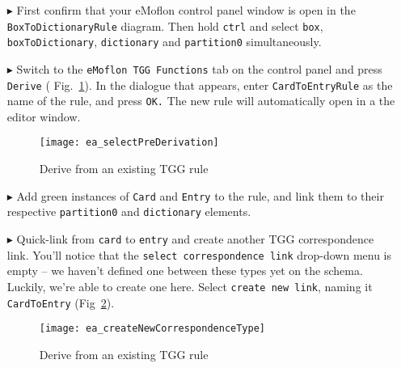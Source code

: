\begin{enumerate}
  
\item[$\blacktriangleright$] First confirm that your eMoflon control panel window is open in the \texttt{Box\-To\-Dictionary\-Rule} diagram. Then hold
\texttt{ctrl} and select \texttt{box}, \texttt{box\-To\-Dictionary}, \texttt{dictionary} and \texttt{partition0} simultaneously.
  
\item[$\blacktriangleright$] Switch to the \texttt{eMoflon TGG Functions} tab on the control panel and press \texttt{Derive} (
Fig.~\ref{ea:derive_from_tgg_rule}). In the dialogue that appears, enter \texttt{CardToEntryRule} as the name of the rule, and press \texttt{OK.} The new rule
will automatically open in a the editor window.

\begin{figure}[htbp]
\begin{center}
 \texttt{[image: ea\_selectPreDerivation]}
  \caption{Derive from an existing TGG rule}
  \label{ea:derive_from_tgg_rule}
\end{center}
\end{figure}
\FloatBarrier

\item[$\blacktriangleright$] Add green instances of \texttt{Card} and \texttt{Entry} to the rule, and link them to their respective \texttt{partition0} and
\texttt{dictionary} elements. 

\vspace{0.5cm}

\item[$\blacktriangleright$] Quick-link from \texttt{card} to \texttt{entry} and create another TGG correspondence link. You'll notice that the
\texttt{select correspondence link} drop-down menu is empty -- we haven't defined one between these types yet on the schema. Luckily, we're able to create one
here. Select \texttt{create new link}, naming it \texttt{CardToEntry} (Fig~\ref{ea:newCorrespondenceDialogue}). 

\vspace{0.5cm}

\begin{figure}[htbp]
\begin{center}
 \texttt{[image: ea\_createNewCorrespondenceType]}
  \caption{Derive from an existing TGG rule}
  \label{ea:newCorrespondenceDialogue}
\end{center}
\end{figure}


\end{enumerate}
